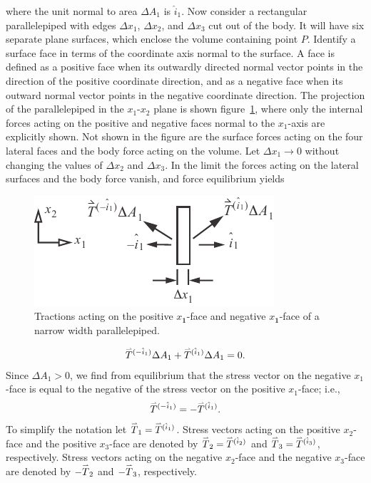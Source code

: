 \documentclass{AeroStructure-ERJohnson}
\def\harp#1{\smash{\mathord{\buildrel{\lower3pt\hbox{$\scriptscriptstyle\rightharpoonup$}}\over{#1}}}}
\begin{document}
\noindent where the unit normal to area $\Delta A_{1}$ is $\hat{i}_{1}$. Now consider a rectangular parallelepiped with edges $\Delta x_{1}$, $\Delta x_{2}$, and $\Delta x_{3}$ cut out of the body. It will have six separate plane surfaces, which enclose the volume containing point $P$. Identify a surface face in terms of the coordinate axis normal to the surface. A face is defined as a positive face when its outwardly directed normal vector points in the direction of the positive coordinate direction, and as a negative face when its outward normal vector points in the negative coordinate direction. The projection of the parallelepiped in the $x_{1}$-$x_{2}$ plane is shown figure~\ref{figA.4}, where only the internal forces acting on the positive and negative faces normal to the $x_{1}$-axis are explicitly shown. Not shown in the figure are the surface forces acting on the four lateral faces and the body force acting on the volume. Let $\Delta x_{1} \rightarrow 0$ without changing the values of $\Delta x_{2}$ and $\Delta x_{3}$. In the limit the forces acting on the lateral surfaces and the body force vanish, and force equilibrium yields
\begin{figure}
\includegraphics{Figure_A-4.pdf}
\caption{Tractions acting on the positive $x_{\textbf{1}}$-face and negative $x_{\textbf{1}}$-face of a narrow width parallelepiped.\label{figA.4}}
\end{figure}
\vspace*{-1pc}
\begin{align}\label{eqA.68}
\harp{T}^{(-\hat{i}_{1})} \Delta A_{1}+\harp{T}^{(\hat{i}_{1})} \Delta A_{1}=0.
\end{align}
Since $\Delta A_{1}>0$, we find from equilibrium that the stress vector on the negative $x_{1}$-face is equal to the negative of the stress vector on the positive $x_{1}$-face; i.e.,
\begin{align}\label{eqA.69}
\harp{T}^{(-\hat{i}_{1})}=-\harp{T}^{(\hat{i}_{1})}.
\end{align}
 To simplify the notation let $\harp{T}_{1}=\harp{T}^{(\hat{i}_{1})}$. Stress vectors acting on the positive $x_{2}$-face and the positive $x_{3}$-face are denoted by $\harp{T}_{2}=\harp{T}^{(\hat{i}_{2})}$ and $\harp{T}_{3}=\harp{T}^{(\hat{i}_{3})}$, respectively. Stress vectors acting on the negative $x_{2}$-face and the negative $x_{3}$-face are denoted by $-\harp{T}_{2}$ and $-\harp{T}_{3}$, respectively.
\end{document}
